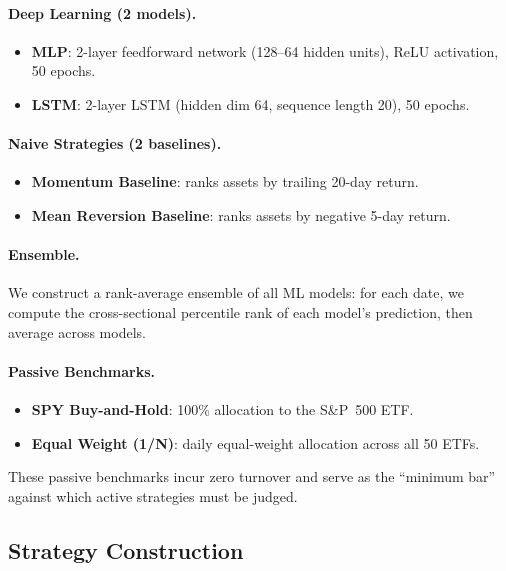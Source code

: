 \documentclass[11pt]{article}
\begin{document}
\paragraph{Deep Learning (2 models).}
\begin{itemize}[leftmargin=1.4em]
  \item \textbf{MLP}: 2-layer feedforward network (128--64 hidden units), ReLU activation, 50 epochs.
  \item \textbf{LSTM}: 2-layer LSTM (hidden dim 64, sequence length 20), 50 epochs.
\end{itemize}

\paragraph{Naive Strategies (2 baselines).}
\begin{itemize}[leftmargin=1.4em]
  \item \textbf{Momentum Baseline}: ranks assets by trailing 20-day return.
  \item \textbf{Mean Reversion Baseline}: ranks assets by negative 5-day return.
\end{itemize}

\paragraph{Ensemble.}
We construct a rank-average ensemble of all ML models: for each date, we compute the cross-sectional percentile rank of each model's prediction, then average across models.

\paragraph{Passive Benchmarks.}
\begin{itemize}[leftmargin=1.4em]
  \item \textbf{SPY Buy-and-Hold}: 100\% allocation to the S\&P~500 ETF.
  \item \textbf{Equal Weight (1/N)}: daily equal-weight allocation across all 50 ETFs.
\end{itemize}

These passive benchmarks incur zero turnover and serve as the ``minimum bar'' against which active strategies must be judged.

\subsection{Strategy Construction}
\end{document}
